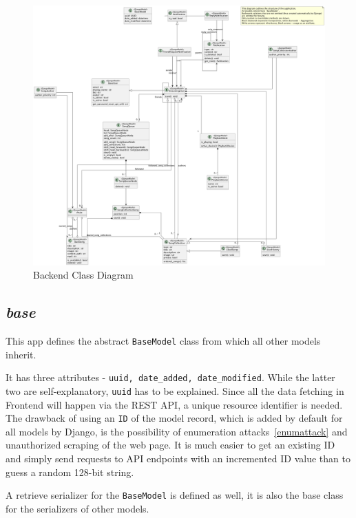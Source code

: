 \begin{figure}[htbp]
    \centering
    \begin{adjustbox}{angle=90, width=1.4\textwidth, center}
        \includegraphics{diagrams/class.png}
    \end{adjustbox}
    \caption{Backend Class Diagram}
    \label{fig:beclassdiagram}
\end{figure}

\subsection{\textit{base}}\label{subsec:base}
This app defines the abstract \texttt{BaseModel} class from which all other models inherit.

It has three attributes - \texttt{uuid, date\_added, date\_modified}. While the latter two are self-explanatory,
\texttt{uuid} has to be explained. Since all the data fetching in Frontend will happen via the REST API,
a unique resource identifier is needed. The drawback of using an \texttt{ID} of the model record,
which is added by default for all models by Django, is the possibility of enumeration attacks~\ref{enumattack}
and unauthorized scraping of the web page. It is much easier to get an existing ID and
simply send requests to API endpoints with an incremented ID value than to guess a random 128-bit string.

A retrieve serializer for the \texttt{BaseModel} is defined as well,
it is also the base class for the serializers of other models.

